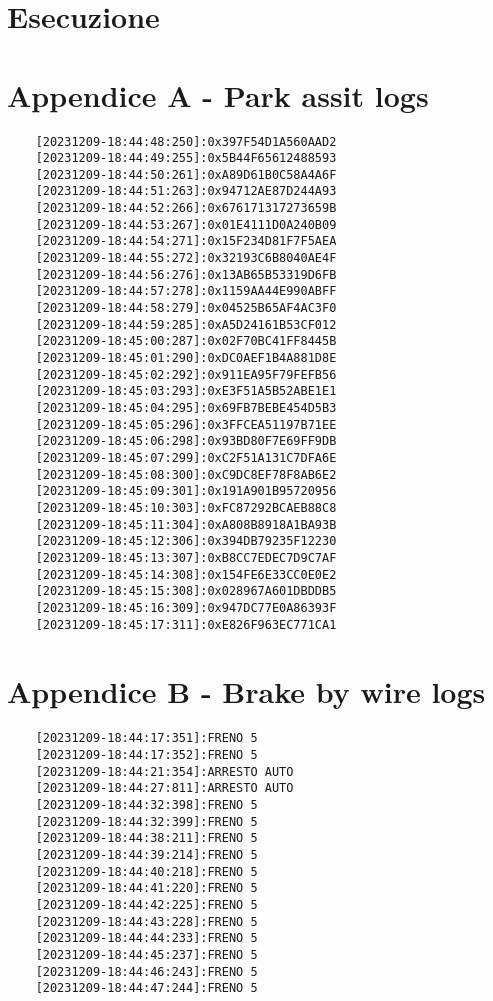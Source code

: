 \documentclass[12pt]{article}
\begin{document}
\section{Esecuzione}

\section{Appendice A - Park assit logs}
\begin{verbatim}
    [20231209-18:44:48:250]:0x397F54D1A560AAD2
    [20231209-18:44:49:255]:0x5B44F65612488593
    [20231209-18:44:50:261]:0xA89D61B0C58A4A6F
    [20231209-18:44:51:263]:0x94712AE87D244A93
    [20231209-18:44:52:266]:0x676171317273659B
    [20231209-18:44:53:267]:0x01E4111D0A240B09
    [20231209-18:44:54:271]:0x15F234D81F7F5AEA
    [20231209-18:44:55:272]:0x32193C6B8040AE4F
    [20231209-18:44:56:276]:0x13AB65B53319D6FB
    [20231209-18:44:57:278]:0x1159AA44E990ABFF
    [20231209-18:44:58:279]:0x04525B65AF4AC3F0
    [20231209-18:44:59:285]:0xA5D24161B53CF012
    [20231209-18:45:00:287]:0x02F70BC41FF8445B
    [20231209-18:45:01:290]:0xDC0AEF1B4A881D8E
    [20231209-18:45:02:292]:0x911EA95F79FEFB56
    [20231209-18:45:03:293]:0xE3F51A5B52ABE1E1
    [20231209-18:45:04:295]:0x69FB7BEBE454D5B3
    [20231209-18:45:05:296]:0x3FFCEA51197B71EE
    [20231209-18:45:06:298]:0x93BD80F7E69FF9DB
    [20231209-18:45:07:299]:0xC2F51A131C7DFA6E
    [20231209-18:45:08:300]:0xC9DC8EF78F8AB6E2
    [20231209-18:45:09:301]:0x191A901B95720956
    [20231209-18:45:10:303]:0xFC87292BCAEB88C8
    [20231209-18:45:11:304]:0xA808B8918A1BA93B
    [20231209-18:45:12:306]:0x394DB79235F12230
    [20231209-18:45:13:307]:0xB8CC7EDEC7D9C7AF
    [20231209-18:45:14:308]:0x154FE6E33CC0E0E2
    [20231209-18:45:15:308]:0x028967A601DBDDB5
    [20231209-18:45:16:309]:0x947DC77E0A86393F
    [20231209-18:45:17:311]:0xE826F963EC771CA1
\end{verbatim}

\section{Appendice B - Brake by wire logs}
\begin{verbatim}
    [20231209-18:44:17:351]:FRENO 5
    [20231209-18:44:17:352]:FRENO 5
    [20231209-18:44:21:354]:ARRESTO AUTO
    [20231209-18:44:27:811]:ARRESTO AUTO
    [20231209-18:44:32:398]:FRENO 5
    [20231209-18:44:32:399]:FRENO 5
    [20231209-18:44:38:211]:FRENO 5
    [20231209-18:44:39:214]:FRENO 5
    [20231209-18:44:40:218]:FRENO 5
    [20231209-18:44:41:220]:FRENO 5
    [20231209-18:44:42:225]:FRENO 5
    [20231209-18:44:43:228]:FRENO 5
    [20231209-18:44:44:233]:FRENO 5
    [20231209-18:44:45:237]:FRENO 5
    [20231209-18:44:46:243]:FRENO 5
    [20231209-18:44:47:244]:FRENO 5
\end{verbatim}
\end{document}
